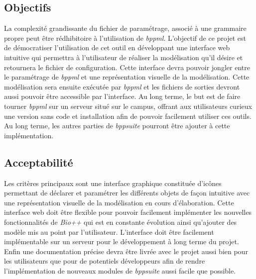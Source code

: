 	
\subsection{Objectifs}
	La complexité grandissante du fichier de paramétrage, associé à une grammaire propre peut être rédhibitoire à l'utilisation de \textit{bppml}. L'objectif de ce projet est de démocratiser l'utilisation de cet outil en développant une interface web intuitive qui permettra à l'utilisateur de réaliser la modélisation qu'il désire et retournera le fichier de configuration. Cette interface devra pouvoir jongler entre le paramétrage de \textit{bppml} et une représentation visuelle de la modélisation. Cette modélisation sera ensuite exécutée par \textit{bppml} et les fichiers de sorties devront aussi pouvoir être accessible par l'interface. Au long terme, le but est de faire tourner \textit{bppml} sur un serveur situé sur le campus, offrant aux utilisateurs curieux une version sans code et installation afin de pouvoir facilement utiliser ces outils. Au long terme, les autres parties de \textit{bppsuite} pourront être ajouter à cette implémentation.
	
\subsection{Acceptabilité}
	Les critères principaux sont une interface graphique constituée d'icônes permettant de déclarer et paramétrer les différents objets de façon intuitive avec une représentation visuelle de la modélisation en cours d'élaboration. Cette interface web doit être flexible pour pouvoir facilement implémenter les nouvelles fonctionnalités de \textit{Bio++} qui est en constante évolution ainsi qu'ajouter des modèle mis au point par l'utilisateur. L'interface doit être facilement implémentable sur un serveur pour le développement à long terme du projet.
Enfin une documentation précise devra être livrée avec le projet aussi bien pour les utilisateurs que pour de potentiels développeurs
 afin de rendre l'implémentation de nouveaux modules de \textit{bppsuite} aussi facile que possible.
	
